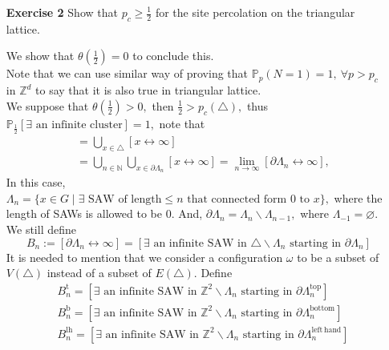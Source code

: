 \documentclass[12pt,a4paper]{report}
\theoremstyle{definition}
\newcommand{\SOL}{\fbox{ \tt s\parbox[b][2pt][c]{6pt}{o}\hspace*{-7pt} L:}}
\begin{document}
\begin{enumerate}
\begin{proof}
\begin{align*}
	\mathbb{P}_\frac{1}{2}(N\geq 2)&\geq \mathbb{P}_\frac{1}{2}\big(C_n\cap\mathcal{C}([-n,n]\times [-n-1,n])\big)\\
	&\geq \frac{1}{2}\times\frac{1}{2^{8n^2+8n+1}}>0.
	\end{align*}
	Which contradicts that $\mathbb{P}_\frac{1}{2}(N\geq 2)=0$ on $\mathbb{Z}^2.$
    \end{proof}
    \item[\textbf{Exercise 2}] Show that $p_c\geq \frac{1}{2}$ for the site percolation on the triangular lattice.
    \item[\SOL] We show that $\theta(\frac{1}{2})=0$ to conclude this.\\
    Note that we can use similar way of proving that $\mathbb{P}_{p}(N=1)=1,\ \forall p>p_c$ in $\mathbb{Z}^d$ to say that it is also true in triangular lattice.\\
    We suppose that $\theta(\frac{1}{2})>0,$ then $\frac{1}{2}>p_c(\triangle),$ thus $\mathbb{P}_\frac{1}{2}[\exists\mbox{ an infinite cluster}]=1,$ note that 
    \begin{align*}
    [\exists\mbox{ an infinite cluster}]&=\bigcup_{x\in \triangle}[x\leftrightarrow\infty]\\
    &=\bigcup_{n\in\mathbb{N}}\bigcup_{x\in\partial\Lambda_n}[x\leftrightarrow\infty] =\lim_{n\to\infty}[\partial\Lambda_n\leftrightarrow\infty],
    \end{align*}
    In this case, $\Lambda_n=\{x\in G\mid \exists\mbox{ SAW of length}\leq n\mbox{ that connected form 0 to }x\},$ where the length of SAWs is allowed to be 0. And, $\partial\Lambda_n=\Lambda_n\backslash\Lambda_{n-1},$ where $\Lambda_{-1}=\varnothing.$\\
    We still define
    \[
    B_n:=[\partial\Lambda_n\leftrightarrow\infty]=[\exists\mbox{ an infinite SAW in }\triangle\backslash\Lambda_n\mbox{ starting in }\partial\Lambda_n]
    \]
    It is needed to mention that we consider a configuration $\omega$ to be a subset of $V(\triangle)$ instead of a subset of $E(\triangle).$ Define
    \begin{align*}
        &B_n^{\mathrm{t}}=[\exists\mbox{ an infinite SAW in }\mathbb{Z}^2\backslash\Lambda_n\mbox{ starting in }\partial\Lambda_n^\mathrm{top}]\\
        &B_n^{\mathrm{b}}=[\exists\mbox{ an infinite SAW in }\mathbb{Z}^2\backslash\Lambda_n\mbox{ starting in }\partial\Lambda_n^\mathrm{bottom}]\\
        &B_n^{\mathrm{lh}}=[\exists\mbox{ an infinite SAW in }\mathbb{Z}^2\backslash\Lambda_n\mbox{ starting in }\partial\Lambda_n^\mathrm{left\, hand}]\\

\end{align*}
\end{enumerate}
\end{document}
